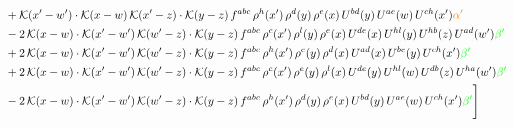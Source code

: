 \documentclass[9pt]{article}
\numberwithin{equation}{section}
\begin{document}
\begin{align}
&+\mathcal{K}(x'-w')\cdot\mathcal{K}(x-w)\,\mathcal{K}(x'-z)\cdot\mathcal{K}(y-z)\, f^{abc}\,\rho^{h}(x')\,\rho^{d}(y)\,\rho^{e}(x)\,U^{bd}(y)\,U^{ae}(w)\,U^{ch}(x'){\color{orange} \alpha'}\notag \\ &-2\,\mathcal{K}(x-w)\cdot\mathcal{K}(x'-w')\,\mathcal{K}(w'-z)\cdot\mathcal{K}(y-z)\, f^{abc}\,\rho^{c}(x')\,\rho^{l}(y)\,\rho^{e}(x)\,U^{de}(x)\,U^{hl}(y)\,U^{hb}(z)\,U^{ad}(w'){\color{green} \beta'}\notag\\ & +2\,\mathcal{K}(x-w)\cdot\mathcal{K}(x'-w')\,\mathcal{K}(w'-z)\cdot\mathcal{K}(y-z)\, f^{abc}\,\rho^{h}(x')\,\rho^{e}(y)\,\rho^{d}(x)\,U^{ad}(x)\,U^{be}(y)\,U^{ch}(x'){\color{green} \beta'}\notag\\ & +2\,\mathcal{K}(x-w)\cdot\mathcal{K}(x'-w')\,\mathcal{K}(w'-z)\cdot\mathcal{K}(y-z)\, f^{abc}\,\rho^{c}(x')\,\rho^{e}(y)\,\rho^{l}(x)\,U^{de}(y)\,U^{hl}(w)\,U^{db}(z)\,U^{ha}(w'){\color{green} \beta'}\notag\\ &-2\,\mathcal{K}(x-w)\cdot\mathcal{K}(x'-w')\,\mathcal{K}(w'-z)\cdot\mathcal{K}(y-z)\, f^{abc}\,\rho^{h}(x')\,\rho^{d}(y)\,\rho^{e}(x)\,U^{bd}(y)\,U^{ae}(w)\,U^{ch}(x'){\color{green} \beta'}\Bigg] 
\end{align}     
\end{document}
